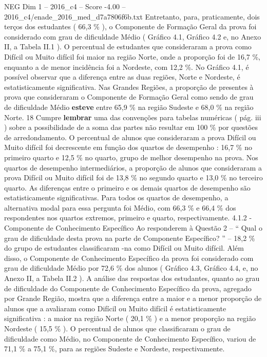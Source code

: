 \begin{textsample}{NEG Dim 1 – 2016\_c4 – Score -4.00 – 2016\_c4/enade\_2016\_med\_d7a7806f6b.txt}
Entretanto, para, praticamente, dois terços dos estudantes ( 66,3 \% ), o Componente de Formação Geral da prova foi considerado com grau de dificuldade Médio ( Gráfico 4.1, Gráfico 4.2 e, no Anexo II, a Tabela II.1 ).
O percentual de estudantes que consideraram a prova como Difícil ou Muito difícil foi maior na região Norte, onde a proporção foi de 16,7 \%, enquanto a de menor incidência foi a Nordeste, com 12,2 \%.
No Gráfico 4.1, é possível observar que a diferença entre as duas regiões, Norte e Nordeste, é estatisticamente significativa.
Nas Grandes Regiões, a proporção de presentes à prova que consideraram o Componente de Formação Geral como sendo de grau de dificuldade Médio \textbf{esteve} entre 65,9 \% na região Sudeste e 68,0 \% na região Norte. 18 Cumpre \textbf{lembrar} uma das convenções para tabelas numéricas ( pág. iii ) sobre a possibilidade de a soma das partes não resultar em 100 \% por questões de arredondamento.
O percentual de alunos que consideraram a prova Difícil ou Muito difícil foi decrescente em função dos quartos de desempenho : 16,7 \% no primeiro quarto e 12,5 \% no quarto, grupo de melhor desempenho na prova.
Nos quartos de desempenho intermediários, a proporção de alunos que consideraram a prova Difícil ou Muito difícil foi de 13,8 \% no segundo quarto e 13,0 \% no terceiro quarto.
As diferenças entre o primeiro e os demais quartos de desempenho são estatisticamente significativas.
Para todos os quartos de desempenho, a alternativa modal para essa pergunta foi Médio, com 66,3 \% e 66,4 \% dos respondentes nos quartos extremos, primeiro e quarto, respectivamente. 4.1.2 - Componente de Conhecimento Específico Ao responderem à Questão 2 – “ Qual o grau de dificuldade desta prova na parte de Componente Específico? ” – 18,2 \% do grupo de estudantes classificaram -na como Difícil ou Muito difícil.
Além disso, o Componente de Conhecimento Específico da prova foi considerado com grau de dificuldade Médio por 72,6 \% dos alunos ( Gráfico 4.3, Gráfico 4.4, e, no Anexo II, a Tabela II.2 ).
A análise das respostas dos estudantes, quanto ao grau de dificuldade do Componente de Conhecimento Específico da prova, agregado por Grande Região, mostra que a diferença entre a maior e a menor proporção de alunos que a avaliaram como Difícil ou Muito difícil é estatisticamente significativa : a maior na região Norte ( 20,1 \% ) e a menor proporção na região Nordeste ( 15,5 \% ).
O percentual de alunos que classificaram o grau de dificuldade como Médio, no Componente de Conhecimento Específico, variou de 71,1 \% a 75,1 \%, para as regiões Sudeste e Nordeste, respectivamente.

\end{textsample}
